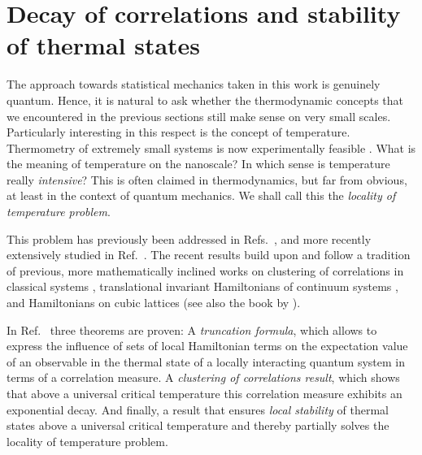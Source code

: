 \documentclass[a4paper,12pt,listof=totoc,index=totoc,bibliography=totoc,headsepline=false,headings=normal,BCOR16.153846mm,DIV12,headinclude,twoside,cleardoublepage=empty,numbers=noenddot,final]{scrreprt}
\theoremstyle{mystyle}
\numberwithin{equation}{section}
\numberwithin{figure}{section}
\numberwithin{lemma}{section}
\numberwithin{theorem}{section}
\numberwithin{corollary}{section}
\numberwithin{definition}{section}
\numberwithin{conjecture}{section}
\numberwithin{observation}{section}
\newcommand{\+}{\mkern2mu}
\DeclareMathOperator{\1}{\mathds{1}}
\begin{document}
\section{Decay of correlations and stability of thermal states}
\label{sec:propertiesofthermalstatesofcompositesystems}
%
The approach towards statistical mechanics taken in this work is genuinely quantum.
Hence, it is natural to ask whether the thermodynamic concepts that we encountered in the previous sections still make sense on very small scales.
Particularly interesting in this respect is the concept of temperature.
Thermometry of extremely small systems is now experimentally feasible \cite{GaoBan02,PotGueBir97,PengPeng13}.
What is the meaning of temperature on the nanoscale?
In which sense is temperature really \emph{intensive}?
This is often claimed in thermodynamics, but far from obvious, at least in the context of quantum mechanics.
We shall call this the \emph{locality of temperature problem}.

This problem has previously been addressed in Refs.~\cite{Hartmann2003,Hartmann2004,Hartmann2004a,0908.3157v3}, and more recently extensively studied in Ref.~\cite{Kliesch2013a}.
The recent results build upon and follow a tradition of previous, more mathematically inclined works on clustering of correlations in classical systems \cite{Rue99_stat_mech_book}, translational invariant Hamiltonians of continuum systems \cite{Gin65}, and Hamiltonians on cubic lattices \cite{Greenberg1969,Greenberg1969a,Park1995} (see also the book by \textcite{BratteliRobinson2}).

In Ref.~\cite{Kliesch2013a} three theorems are proven:
A \emph{truncation formula}, which allows to express the influence of sets of local Hamiltonian terms on the expectation value of an observable in the thermal state of a locally interacting quantum system in terms of a correlation measure.
A \emph{clustering of correlations result}, which shows that above a universal critical temperature this correlation measure exhibits an exponential decay.
And finally, a result that ensures \emph{local stability} of thermal states above a universal critical temperature and thereby partially solves the locality of temperature problem.
\end{document}
